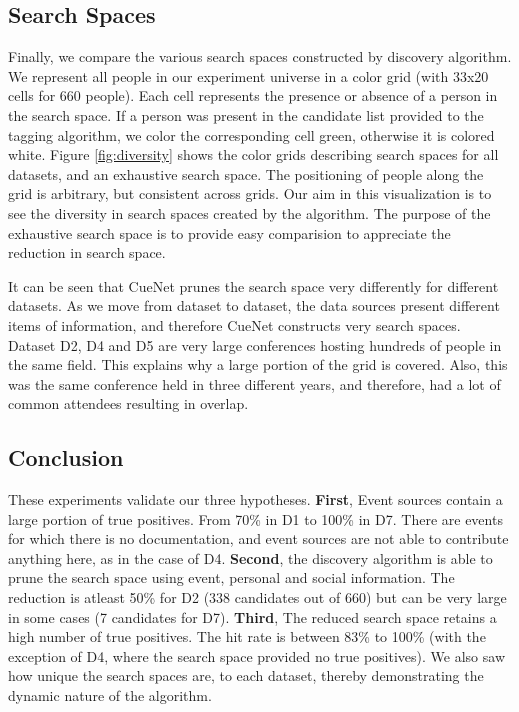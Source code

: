 \subsection{Search Spaces}
Finally, we compare the various search spaces constructed by discovery algorithm. We represent all people in our experiment universe in a color grid (with 33x20 cells for 660 people). Each cell represents the presence or absence of a person in the search space. If a person was present in the candidate list provided to the tagging algorithm, we color the corresponding cell green, otherwise it is colored white. Figure \ref{fig:diversity} shows the color grids describing search spaces for all datasets, and an exhaustive search space. The positioning of people along the grid is arbitrary, but consistent across grids. Our aim in this visualization is to see the diversity in search spaces created by the algorithm. The purpose of the exhaustive search space is to provide easy comparision to appreciate the reduction in search space. 

It can be seen that CueNet prunes the search space very differently for different datasets. As we move from dataset to dataset, the data sources present different items of information, and therefore CueNet constructs very search spaces. Dataset D2, D4 and D5 are very large conferences hosting hundreds of people in the same field. This explains why a large portion of the grid is covered. Also, this was the same conference held in three different years, and therefore, had a lot of common attendees resulting in overlap.

\subsection{Conclusion}
These experiments validate our three hypotheses. \textbf{First}, Event sources contain a large portion of true positives. From 70\% in D1 to 100\% in D7. There are events for which there is no documentation, and event sources are not able to contribute anything here, as in the case of D4. \textbf{Second}, the discovery algorithm is able to prune the search space using event, personal and social information. The reduction is atleast 50\% for D2 (338 candidates out of 660) but can be very large in some cases (7 candidates for D7). \textbf{Third}, The reduced search space retains a high number of true positives. The hit rate is between 83\% to 100\% (with the exception of D4, where the search space provided no true positives). We also saw how unique the search spaces are, to each dataset, thereby demonstrating the dynamic nature of the algorithm.

